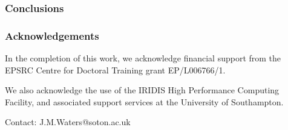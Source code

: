 \documentclass{beamer}
\begin{document}
\begin{frame}
	\frametitle{Conclusions}
\end{frame}

\begin{frame}
	\frametitle{Acknowledgements}
	In the completion of this work, we acknowledge financial support from the EPSRC Centre for Doctoral Training grant EP/L006766/1. \newline
	
	We also acknowledge the use of the IRIDIS High Performance Computing Facility, and associated support services at the University of
Southampton. \newline

	Contact: J.M.Waters@soton.ac.uk
\end{frame}
\end{document}
